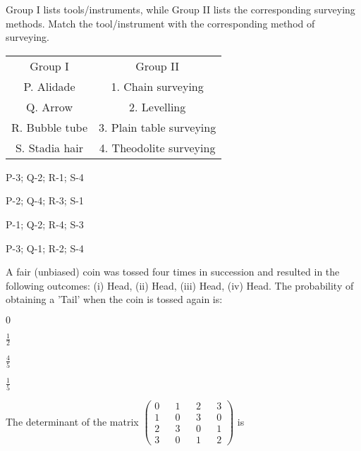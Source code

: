     \item Group I lists tools/instruments, while Group II lists the corresponding surveying methods. Match the tool/instrument with the corresponding method of surveying.
   \begin{table}[h]
        \centering
        \begin{tabular}{ c@{\hskip 1cm }c }
            Group I & Group II \\
            P. Alidade & 1. Chain surveying \\
            Q. Arrow & 2. Levelling \\
            R. Bubble tube & 3. Plain table surveying \\
            S. Stadia hair & 4. Theodolite surveying \\
        \end{tabular}
    \end{table}

    \begin{enumerate}
        \begin{multicols}{2}
            \item P-3; Q-2; R-1; S-4
            \item P-2; Q-4; R-3; S-1
            \item P-1; Q-2; R-4; S-3
            \item P-3; Q-1; R-2; S-4
        \end{multicols}
    \end{enumerate}

    \item A fair (unbiased) coin was tossed four times in succession and resulted in the following outcomes: (i) Head, (ii) Head, (iii) Head, (iv) Head. The probability of obtaining a 'Tail' when the coin is tossed again is:
    \begin{enumerate}
        \begin{multicols}{4}
            \item $0$
            \item $\frac{1}{2}$
            \item $\frac{4}{5}$
            \item $\frac{1}{5}$
        \end{multicols}
    \end{enumerate}


\item The determinant of the matrix $\begin{pmatrix}
0 && 1 && 2 && 3 \\ 1 && 0 && 3 && 0 \\ 2 && 3 && 0 && 1 \\ 3 && 0 && 1 && 2 \end{pmatrix}$ is \underline{\hspace{1cm}}

